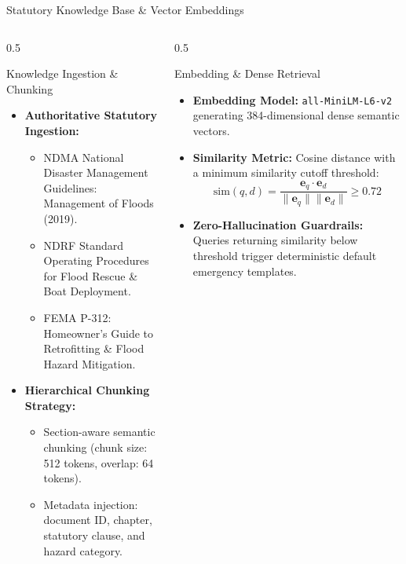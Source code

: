 \documentclass[aspectratio=169, 10pt, professionalfonts]{beamer}
\begin{document}
\begin{frame}{Statutory Knowledge Base \& Vector Embeddings}
  \begin{columns}[T]
    \begin{column}{0.5\textwidth}
      \begin{block}{Knowledge Ingestion \& Chunking}
        \begin{itemize}\setlength{\itemsep}{0.5em}\footnotesize
          \item \textbf{Authoritative Statutory Ingestion:}
            \begin{itemize}\scriptsize
              \item NDMA National Disaster Management Guidelines: Management of Floods (2019).
              \item NDRF Standard Operating Procedures for Flood Rescue \& Boat Deployment.
              \item FEMA P-312: Homeowner's Guide to Retrofitting \& Flood Hazard Mitigation.
            \end{itemize}
          \item \textbf{Hierarchical Chunking Strategy:}
            \begin{itemize}\scriptsize
              \item Section-aware semantic chunking (chunk size: 512 tokens, overlap: 64 tokens).
              \item Metadata injection: document ID, chapter, statutory clause, and hazard category.
            \end{itemize}
        \end{itemize}
      \end{block}
    \end{column}
    
    \begin{column}{0.5\textwidth}
      \begin{block}{Embedding \& Dense Retrieval}
        \begin{itemize}\setlength{\itemsep}{0.5em}\footnotesize
          \item \textbf{Embedding Model:} \texttt{all-MiniLM-L6-v2} generating 384-dimensional dense semantic vectors.
          \item \textbf{Similarity Metric:} Cosine distance with a minimum similarity cutoff threshold:
            $$\text{sim}(q, d) = \frac{\mathbf{e}_q \cdot \mathbf{e}_d}{\|\mathbf{e}_q\| \|\mathbf{e}_d\|} \ge 0.72$$
          \item \textbf{Zero-Hallucination Guardrails:} Queries returning similarity below threshold trigger deterministic default emergency templates.
        \end{itemize}
      \end{block}
    \end{column}
  \end{columns}
\end{frame}
\end{document}
